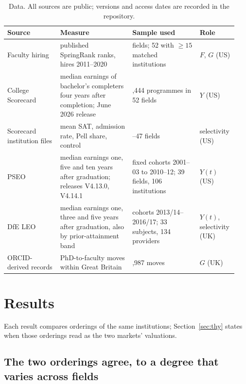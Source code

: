 \begin{table}[!tbp]
\centering
\caption{Data. All sources are public; versions and access dates are recorded in the repository.}\label{tab:data}
\footnotesize
\setlength{\tabcolsep}{3pt}
\begin{tabular}{@{}>{\raggedright\arraybackslash}p{0.22\linewidth}>{\raggedright\arraybackslash}p{0.30\linewidth}>{\raggedright\arraybackslash}p{0.28\linewidth}>{\raggedright\arraybackslash}p{0.14\linewidth}@{}}
\toprule
Source & Measure & Sample used & Role \\
\midrule
Faculty hiring \citep{wapman2022data} & published SpringRank ranks, hires 2011--2020 & 66 fields; 52 with $\ge15$
matched institutions & $F$, $G$ (US) \\
College Scorecard \citep{scorecard} & median earnings of bachelor's completers four years after completion; June 2026
release & 3,444 programmes in 52 fields & $Y$ (US) \\
Scorecard institution files & mean SAT, admission rate, Pell share, control & 46--47 fields &
selectivity (US) \\
PSEO \citep{pseo, pseo2026} & median earnings one, five and ten years after graduation; releases V4.13.0, V4.14.1
& fixed cohorts 2001--03 to 2010--12; 39 fields, 106 institutions & $Y(t)$ (US) \\
DfE LEO \citep{dfe_leo_provider} & median earnings one, three and five years after graduation, also by
prior-attainment band & cohorts 2013/14--2016/17; 33 subjects, 134 providers & $Y(t)$, selectivity (UK) \\
ORCID-derived records \citep{li2026orcid} & PhD-to-faculty moves within Great Britain & 11,987 moves & $G$ (UK) \\
\bottomrule
\end{tabular}
\end{table}

\section{Results}\label{sec:results}

Each result compares orderings of the same institutions; Section~\ref{sec:thy} states when those orderings read as
the two markets' valuations.

\subsection{The two orderings agree, to a degree that varies across fields}\label{sec:res-map}

